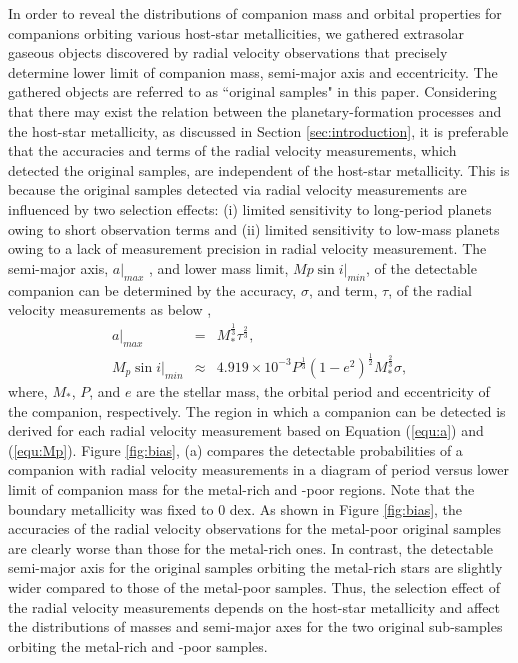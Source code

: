 \documentclass[twocolumn, dvipdfmx]{aastex62}
\begin{document}
\begin{CJK*}{UTF8}{min}
In order to reveal the distributions of companion mass and orbital properties for companions orbiting various host-star metallicities, we gathered extrasolar gaseous objects discovered by radial velocity observations that precisely determine lower limit of companion mass, semi-major axis and eccentricity. The gathered objects are referred to as ``original samples" in this paper. Considering that there may exist the relation between the planetary-formation processes and the host-star metallicity, as discussed in Section \ref{sec:introduction}, it is preferable that the accuracies and terms of the radial velocity measurements, which detected the original samples, are independent of the host-star metallicity. This is because the original samples detected via radial velocity measurements are influenced by two selection effects: (i) limited sensitivity to long-period planets owing to short observation terms and (ii) limited sensitivity to low-mass planets owing to a lack of measurement precision in radial velocity measurement. The semi-major axis, $a|_{max}$ , and lower mass limit, $Mp\sin{i}|_{min}$, of the detectable companion can be determined by the accuracy, $\sigma$, and term, $\tau$, of the radial velocity measurements as below \citep{2008ApJ...677.1324T},
\begin{eqnarray}
\label{equ:a}
a|_{max} &=& M_{*}^{\frac{1}{3}}\tau^{\frac{2}{3}} , \\
\label{equ:Mp}
M_p\sin i|_{min} &\approx& 4.919\times10^{-3}P^{\frac{1}{3}}(1-e^2)^{\frac{1}{2}}M_{*}^{\frac{2}{3}}\sigma ,
\end{eqnarray}
where, $M_*$, $P$, and $e$ are the stellar mass, the orbital period and eccentricity of the companion, respectively. The region in which a companion can be detected is derived for each radial velocity measurement based on Equation (\ref{equ:a}) and (\ref{equ:Mp}). Figure \ref{fig:bias}, (a) compares the detectable probabilities of a companion with radial velocity measurements in a diagram of period versus lower limit of companion mass for the metal-rich and -poor regions. Note that the boundary metallicity was fixed to 0 dex. As shown in Figure \ref{fig:bias}, the accuracies of the radial velocity observations for the metal-poor original samples are clearly worse than those for the metal-rich ones. In contrast, the detectable semi-major axis for the original samples orbiting the metal-rich stars are slightly wider compared to those of the metal-poor samples. Thus, the selection effect of the radial velocity measurements depends on the host-star metallicity and affect the distributions of masses and semi-major axes for the two original sub-samples orbiting the metal-rich and -poor samples. 


\end{CJK*}
\end{document}
